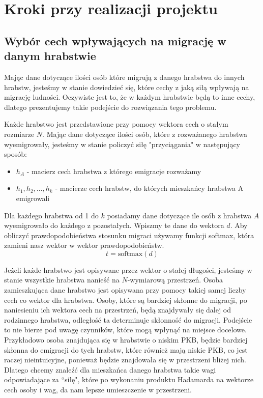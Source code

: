 \documentclass[a4paper,12pt]{article}
\newcommand{\softmax}{\mathrm{softmax}}
\begin{document}
\newpage
\section*{Kroki przy realizacji projektu}
\subsection*{Wybór cech wpływających na migrację w danym hrabstwie}
Mając dane dotyczące ilości osób które migrują z danego hrabstwa do innych hrabstw, jesteśmy w stanie dowiedzieć się, które cechy z jaką siłą wpływają na migrację ludności. Oczywiste jest to, że w każdym hrabstwie będą to inne cechy, dlatego prezentujemy takie podejście do rozwiązania tego problemu.

Każde hrabstwo jest przedstawione przy pomocy wektora cech o stałym rozmiarze $N$. Mając dane dotyczące ilości osób, które z rozważanego hrabstwa wyemigrowały, jesteśmy w stanie policzyć siłę "przyciągania" w następujący sposób:
\begin{itemize}
    \item $h_A$ - macierz cech hrabstwa z którego emigracje rozważamy
    \item $h_1, h_2, \dots, h_k$ - macierze cech hrabstw, do których mieszkańcy hrabstwa A emigrowali
\end{itemize}
Dla każdego hrabstwa od 1 do $k$ posiadamy dane dotyczące ile osób z hrabstwa $A$ wyemigrowało do każdego z pozostałych. Wpiszmy te dane do wektora $d$. Aby obliczyć prawdopodobieństwa stosunku migraci używamy funkcji softmax, która zamieni nasz wektor w wektor prawdopodobieństw.
\begin{equation}
    t = \softmax(d)
\end{equation}

Jeżeli każde hrabstwo jest opisywane przez wektor o stałej długości, jesteśmy w stanie wszystkie hrabstwa nanieść na $N$-wymiarową przestrzeń. Osoba zamieszkująca dane hrabstwo jest opisywana przy pomocy takiej samej liczby cech co wektor dla hrabstwa. Osoby, które są bardziej skłonne do migracji, po naniesieniu ich wektora cech na przestrzeń, będą znajdywały się dalej od rodzinnego hrabstwa, odległość ta determinuje skłonność do migracji. Podejście to nie bierze pod uwagę czynników, które mogą wpłynąć na miejsce docelowe. Przykładowo osoba znajdująca się w hrabstwie o niskim PKB, będzie bardziej skłonna do emigracji do tych hrabstw, które również mają niskie PKB, co jest raczej nieintuicyjne, ponieważ będzie znajdowała się w przestrzeni bliżej nich. Dlatego chcemy znaleźć dla mieszkańca danego hrabstwa takie wagi odpowiadające za ``siłę", które po wykonaniu produktu Hadamarda na wektorze cech osoby i wag, da nam lepsze umieszczenie w przestrzeni.
\end{document}
